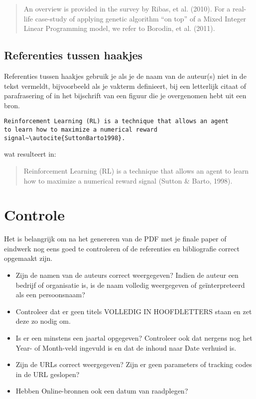 \begin{quotation}
  An overview is provided in the survey by Ribas, et al. (2010). For a real-life case-study of applying genetic algorithm ``on top'' of a Mixed Integer Linear Programming model, we refer to Borodin, et al. (2011).
\end{quotation}

\subsection{Referenties tussen haakjes}%
\label{ssec:referenties_tussen_haakjes}

Referenties tussen haakjes gebruik je als je de naam van de auteur(s) niet in de tekst vermeldt, bijvoorbeeld als je vakterm definieert, bij een letterlijk citaat of parafrasering of in het bijschrift van een figuur die je overgenomen hebt uit een bron.

\begin{verbatim}
Reinforcement Learning (RL) is a technique that allows an agent
to learn how to maximize a numerical reward
signal~\autocite{SuttonBarto1998}.
\end{verbatim}

wat resulteert in:

\begin{quotation}
  Reinforcement Learning (RL) is a technique that allows an agent to learn how to maximize a numerical reward signal (Sutton \& Barto, 1998).
\end{quotation}

\section{Controle}%
\label{sec:bibliografie-controle}

Het is belangrijk om na het genereren van de PDF met je finale paper of eindwerk nog eens goed te controleren of de referenties en bibliografie correct opgemaakt zijn.

\begin{itemize}
  \item Zijn de namen van de auteurs correct weergegeven? Indien de auteur een bedrijf of organisatie is, is de naam volledig weergegeven of geïnterpreteerd als een persoonsnaam?
  \item Controleer dat er geen titels VOLLEDIG IN HOOFDLETTERS staan en zet deze zo nodig om.
  \item Is er een minstens een jaartal opgegeven? Controleer ook dat nergens nog het Year- of Month-veld ingevuld is en dat de inhoud naar Date verhuisd is.
  \item Zijn de URLs correct weergegeven? Zijn er geen parameters of tracking codes in de URL geslopen?
  \item Hebben Online-bronnen ook een datum van raadplegen?
  \end{itemize}

